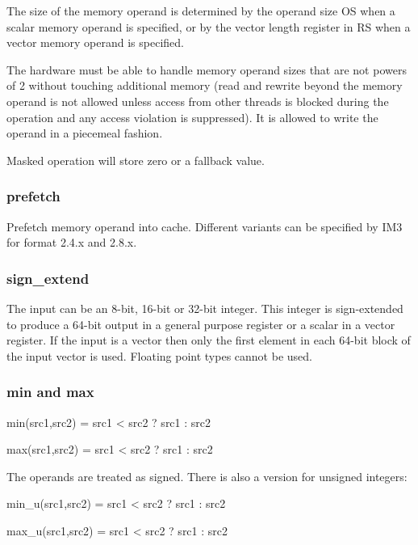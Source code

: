 \documentclass[forwardcom.tex]{subfiles}
\begin{document}
The size of the memory operand is determined by the operand size OS when a scalar memory operand is specified, or by the vector length register in RS when a vector memory operand is specified.
\vspace{2mm}

The hardware must be able to handle memory operand sizes that are not powers of 2 without touching additional memory (read and rewrite beyond the memory operand is not allowed unless access from other threads is blocked during the operation and any access violation is suppressed). It is allowed to write the operand in a piecemeal fashion.
\vspace{2mm}

Masked operation will store zero or a fallback value. 
\vspace{2mm}


\subsubsection{prefetch}
Prefetch memory operand into cache. Different variants can be specified by IM3 for format 2.4.x and 2.8.x.

\subsubsection{sign\_extend}
The input can be an 8-bit, 16-bit or 32-bit integer. This integer is sign-extended to produce a 64-bit output in a general purpose register or a scalar in a vector register. If the input is a vector then only the first element in each 64-bit block of the input vector is used. Floating point types cannot be used.

\subsubsection{min and max}
min(src1,src2) = src1 \textless{} src2 ? src1 : src2

max(src1,src2) = src1 \textless{} src2 ? src1 : src2
\vspace{2mm}

The operands are treated as signed. There is also a version for unsigned integers:
\vspace{2mm}

min\_u(src1,src2) = src1 \textless{} src2 ? src1 : src2

max\_u(src1,src2) = src1 \textless{} src2 ? src1 : src2
\vspace{2mm}
\end{document}
